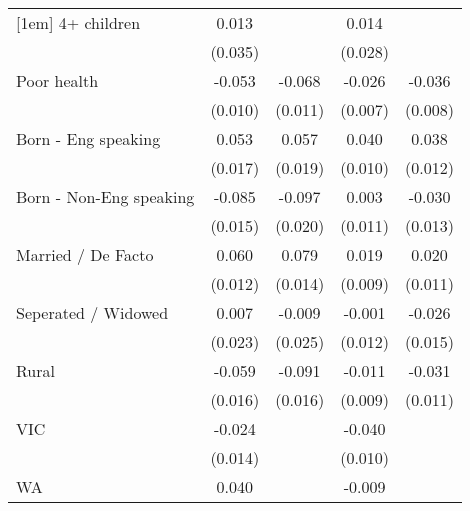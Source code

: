 {\begin{tabular}{l*{4}{c}}
[1em]
4+ children         &       0.013         &                     &       0.014         &                     \\
                    &     (0.035)         &                     &     (0.028)         &                     \\
[1em]
Poor health         &      -0.053\sym{***}&      -0.068\sym{***}&      -0.026\sym{***}&      -0.036\sym{***}\\
                    &     (0.010)         &     (0.011)         &     (0.007)         &     (0.008)         \\
[1em]
Born - Eng speaking &       0.053\sym{**} &       0.057\sym{**} &       0.040\sym{***}&       0.038\sym{**} \\
                    &     (0.017)         &     (0.019)         &     (0.010)         &     (0.012)         \\
[1em]
Born - Non-Eng speaking&      -0.085\sym{***}&      -0.097\sym{***}&       0.003         &      -0.030\sym{*}  \\
                    &     (0.015)         &     (0.020)         &     (0.011)         &     (0.013)         \\
[1em]
Married / De Facto  &       0.060\sym{***}&       0.079\sym{***}&       0.019\sym{*}  &       0.020         \\
                    &     (0.012)         &     (0.014)         &     (0.009)         &     (0.011)         \\
[1em]
Seperated / Widowed &       0.007         &      -0.009         &      -0.001         &      -0.026         \\
                    &     (0.023)         &     (0.025)         &     (0.012)         &     (0.015)         \\
[1em]
Rural               &      -0.059\sym{***}&      -0.091\sym{***}&      -0.011         &      -0.031\sym{**} \\
                    &     (0.016)         &     (0.016)         &     (0.009)         &     (0.011)         \\
[1em]
VIC                 &      -0.024         &                     &      -0.040\sym{***}&                     \\
                    &     (0.014)         &                     &     (0.010)         &                     \\
[1em]
WA                  &       0.040\sym{*}  &                     &      -0.009         &                     \\

\end{tabular}}
